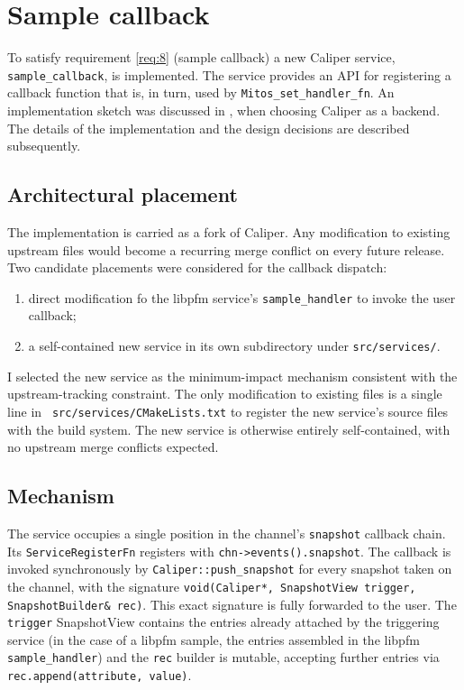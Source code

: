 \section{Sample callback}\label{sec:sample-callback}

To satisfy requirement \ref{req:8} (sample callback) a new Caliper service, \texttt{sample\_callback}, is implemented. The service provides an API for registering a callback function that is, in turn, used by \texttt{Mitos\_set\_handler\_fn}. An implementation sketch was discussed in , when choosing Caliper as a backend. The details of the implementation and the design decisions are described subsequently.

\subsection{Architectural placement}\label{subsec:sample-callback-placement}

The implementation is carried as a fork of Caliper. Any modification to existing upstream files would become a recurring merge conflict on every future release. Two candidate placements were considered for the callback dispatch:
\begin{enumerate}
    \item direct modification fo the libpfm service's \texttt{sample\_handler} to invoke the user callback;
    \item a self-contained new service in its own subdirectory under \texttt{src/services/}.
\end{enumerate}

I selected the new service as the minimum-impact mechanism consistent with the upstream-tracking constraint. The only modification to existing files is a single line in \texttt{
    src/services/CMakeLists.txt} to register the new service's source files with the build system. The new service is otherwise entirely self-contained, with no upstream merge conflicts expected.

\subsection{Mechanism}\label{subsec:sample-callback-mechanism}

The service occupies a single position in the channel's \texttt{snapshot} callback chain. Its \texttt{ServiceRegisterFn} registers with \texttt{chn->events().snapshot}. The callback is invoked synchronously by \texttt{Caliper::push\_snapshot} for every snapshot taken on the channel, with the signature \texttt{void(Caliper*, SnapshotView trigger, SnapshotBuilder\& rec)}. This exact signature is fully forwarded to the user. The \texttt{trigger} SnapshotView contains the entries already attached by the triggering service (in the case of a libpfm sample, the entries assembled in the libpfm \texttt{sample\_handler}) and the \texttt{rec} builder is mutable, accepting further entries via \texttt{rec.append(attribute, value)}.

